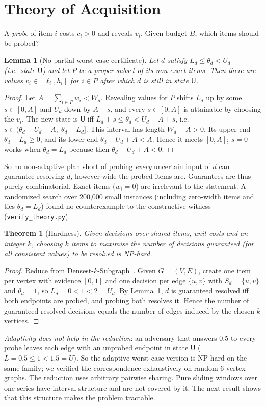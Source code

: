 \documentclass[conference]{IEEEtran}
\newtheorem{lemma}{Lemma}
\newtheorem{theorem}{Theorem}
\newcommand{\U}{\textsf{U}\xspace}
\begin{document}
\section{Theory of Acquisition}
\label{sec:theory}
A \emph{probe} of item $i$ costs $c_i>0$ and reveals $v_i$. Given budget $B$, which items should be probed?
\begin{lemma}[No partial worst-case certificate]
\label{lem:nopartial}
Let $d$ satisfy $L_d\le\theta_d<U_d$ (i.e.\ state $\U$) and let $P$ be a proper subset of its non-exact items. Then there are values
$v_i\in[\ell_i,h_i]$ for $i\in P$ after which $d$ is still in state $\U$.
\end{lemma}
\begin{proof}
Let $A=\sum_{i\in P}w_i<W_d$. Revealing values for $P$ shifts $L_d$ up by some $s\in[0,A]$ and $U_d$ down by $A-s$,
and every $s\in[0,A]$ is attainable by choosing the $v_i$. The new state is $\U$ iff
$L_d+s\le\theta_d<U_d-A+s$, i.e.\ $s\in(\theta_d-U_d+A,\;\theta_d-L_d]$. This interval has length $W_d-A>0$. Its
upper end $\theta_d-L_d\ge0$, and its lower end $\theta_d-U_d+A<A$. Hence it meets $[0,A]$; $s=0$ works when
$\theta_d=L_d$ because then $\theta_d-U_d+A<0$.
\end{proof}
So no non-adaptive plan short of probing \emph{every} uncertain input of $d$ can guarantee resolving $d$, however
wide the probed items are. Guarantees are thus purely combinatorial. Exact items ($w_i=0$) are irrelevant to
the statement. A randomized search over 200{,}000 small instances (including zero-width items and ties
$\theta_d=L_d$) found no counterexample to the constructive witness (\texttt{verify\_theory.py}).
\begin{theorem}[Hardness]
\label{thm:hard}
Given decisions over shared items, unit costs and an integer $k$, choosing $k$ items to maximise the number of
decisions guaranteed (for all consistent values) to be resolved is NP-hard.
\end{theorem}
\begin{proof}
Reduce from Densest-$k$-Subgraph~\cite{feige2001dks}. Given $G=(V,E)$, create one item per vertex with evidence
$[0,1]$ and one decision per edge $\{u,v\}$ with $S_d=\{u,v\}$ and $\theta_d=1$, so $L_d=0<1<2=U_d$. By
Lemma~\ref{lem:nopartial}, $d$ is guaranteed resolved iff both endpoints are probed, and probing both resolves
it. Hence the number of guaranteed-resolved decisions equals the number of edges induced by the chosen $k$
vertices.
\end{proof}
\emph{Adaptivity does not help in the reduction}: an adversary that answers $0.5$ to every probe leaves each edge
with an unprobed endpoint in state $\U$ ($L=0.5\le1<1.5=U$). So the adaptive worst-case version is NP-hard on the
same family; we verified the correspondence exhaustively on random 6-vertex graphs. The reduction uses arbitrary
pairwise sharing. Pure sliding windows over one series have interval structure and are not covered by it. The next
result shows that this structure makes the problem tractable.
\end{document}
